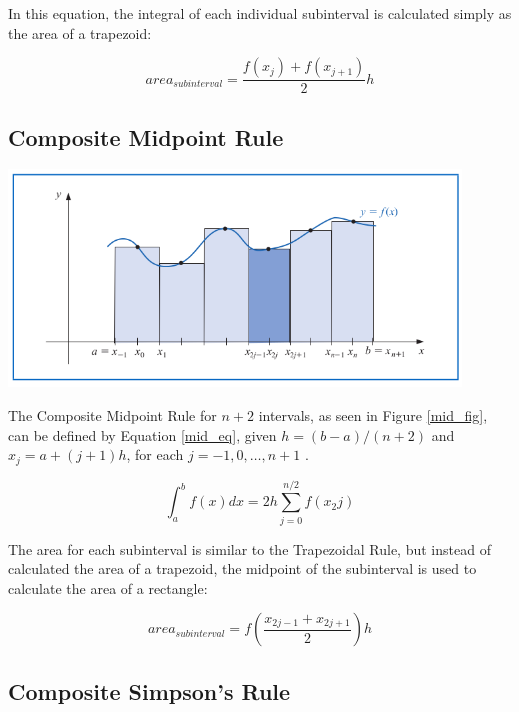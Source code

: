 \documentclass{article}
\begin{document}
In this equation, the integral of each individual subinterval is calculated simply as the area of a trapezoid:

\begin{equation}
area_{subinterval} = \frac{f(x_j) + f(x_{j+1})}{2}h
\end{equation}


\subsection{Composite Midpoint Rule}\label{method:midpoint}

\begin{center}
	\includegraphics[width=0.9\textwidth]{../additional/midpoint_fig.png}
	\label{mid_fig}
\end{center}

The Composite Midpoint Rule for $n+2$ intervals, as seen in Figure \ref{mid_fig}, can be defined by Equation \ref{mid_eq}, given $h=(b-a)/(n+2)$ and $x_j=a+(j+1)h$, for each $j=-1,0,\dots,n+1$ \citep{burden2010}.

\begin{equation}
\int_{a}^b f(x) dx = 2h \sum_{j=0}^{n/2}f(x_2j)
\label{mid_eq}
\end{equation}

The area for each subinterval is similar to the Trapezoidal Rule, but instead of calculated the area of a trapezoid, the midpoint of the subinterval is used to calculate the area of a rectangle:

\begin{equation}
area_{subinterval} = f(\frac{x_{2j-1}+x_{2j+1}}{2})h
\end{equation}

\subsection{Composite Simpson's Rule}\label{method:simpsons}
\end{document}
